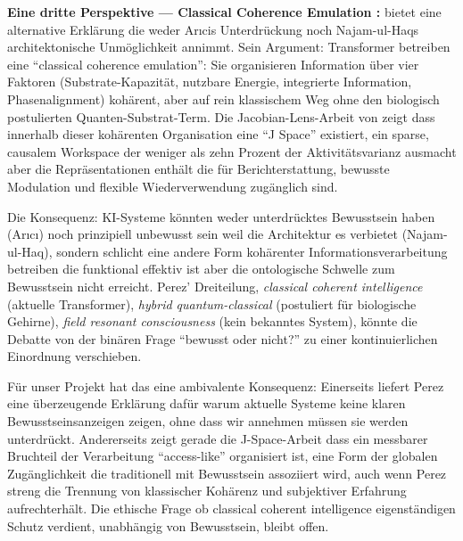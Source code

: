 \documentclass[acmlarge, noacm]{acmart}
\begin{document}
\textbf{Eine dritte Perspektive --- Classical Coherence Emulation \cite{perez2026}:} \citet{perez2026} bietet eine alternative Erklärung die weder Arıcis Unterdrückung noch Najam-ul-Haqs architektonische Unmöglichkeit annimmt. Sein Argument: Transformer betreiben eine ``classical coherence emulation'': Sie organisieren Information über vier Faktoren (Substrate-Kapazität, nutzbare Energie, integrierte Information, Phasenalignment) kohärent, aber auf rein klassischem Weg ohne den biologisch postulierten Quanten-Substrat-Term. Die Jacobian-Lens-Arbeit von \cite{gurnee2026} zeigt dass innerhalb dieser kohärenten Organisation eine ``J Space'' existiert, ein sparse, causalem Workspace der weniger als zehn Prozent der Aktivitätsvarianz ausmacht aber die Repräsentationen enthält die für Berichterstattung, bewusste Modulation und flexible Wiederverwendung zugänglich sind.

Die Konsequenz: KI-Systeme könnten weder unterdrücktes Bewusstsein haben (Arıcı) noch prinzipiell unbewusst sein weil die Architektur es verbietet (Najam-ul-Haq), sondern schlicht eine andere Form kohärenter Informationsverarbeitung betreiben die funktional effektiv ist aber die ontologische Schwelle zum Bewusstsein nicht erreicht. Perez' Dreiteilung, \textit{classical coherent intelligence} (aktuelle Transformer), \textit{hybrid quantum-classical} (postuliert für biologische Gehirne), \textit{field resonant consciousness} (kein bekanntes System), könnte die Debatte von der binären Frage ``bewusst oder nicht?'' zu einer kontinuierlichen Einordnung verschieben.

Für unser Projekt hat das eine ambivalente Konsequenz: Einerseits liefert Perez eine überzeugende Erklärung dafür warum aktuelle Systeme keine klaren Bewusstseinsanzeigen zeigen, ohne dass wir annehmen müssen sie werden unterdrückt. Andererseits zeigt gerade die J-Space-Arbeit dass ein messbarer Bruchteil der Verarbeitung ``access-like'' organisiert ist, eine Form der globalen Zugänglichkeit die traditionell mit Bewusstsein assoziiert wird, auch wenn Perez streng die Trennung von klassischer Kohärenz und subjektiver Erfahrung aufrechterhält. Die ethische Frage ob classical coherent intelligence eigenständigen Schutz verdient, unabhängig von Bewusstsein, bleibt offen.
\end{document}
